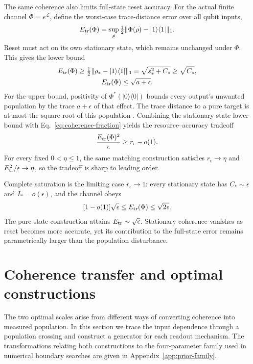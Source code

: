 \documentclass[aps,pra,reprint,amsmath,amssymb,nofootinbib,floatfix,longbibliography]{revtex4-2}
\theoremstyle{aps}
\newcommand{\eps}{\epsilon}
\newcommand{\proj}[1]{|#1\rangle\langle#1|}
\begin{document}
The same coherence also limits full-state reset accuracy. For the actual finite channel $\Phi=e^{\mathcal L}$, define the worst-case trace-distance error over all qubit inputs,
\begin{equation}\label{eq:trace-reset-error}
 E_{\rm tr}(\Phi)=\sup_\rho\tfrac12\|\Phi(\rho)-\proj1\|_1.
\end{equation}
Reset must act on its own stationary state, which remains unchanged under $\Phi$. This gives the lower bound
\begin{equation}\label{eq:trace-reset-bounds}
 \begin{gathered}
 E_{\rm tr}(\Phi)\ge\tfrac12\|\rho_*-\proj1\|_1
 =\sqrt{s_*^2+C_*}\ge\sqrt{C_*},\\
 E_{\rm tr}(\Phi)\le\sqrt{a+\eps}.
 \end{gathered}
\end{equation}
For the upper bound, positivity of $\Phi^*(\proj0)$ bounds every output's unwanted population by the trace $a+\eps$ of that effect. The trace distance to a pure target is at most the square root of this population \cite{FuchsVanDeGraaf1999}. Combining the stationary-state lower bound with Eq.~\eqref{eq:coherence-fraction} yields the resource--accuracy tradeoff
\begin{equation}\label{eq:population-state-tradeoff}
 \frac{E_{\rm tr}(\Phi)^2}{\eps}\ge r_\eps-o(1).
\end{equation}
For every fixed $0<\eta\le1$, the same matching construction satisfies $r_\eps\to\eta$ and $E_{\rm tr}^2/\eps\to\eta$, so the tradeoff is sharp to leading order.

Complete saturation is the limiting case $r_\eps\to1$: every stationary state has $C_*\sim\eps$ and $I_*=o(\eps)$, and the channel obeys
\begin{equation}\label{eq:saturation-trace-cost}
 [1-o(1)]\sqrt\eps\le E_{\rm tr}(\Phi)\le\sqrt{2\eps}.
\end{equation}
The pure-state construction attains $E_{\rm tr}\sim\sqrt\eps$. Stationary coherence vanishes as reset becomes more accurate, yet its contribution to the full-state error remains parametrically larger than the population disturbance.

\section{Coherence transfer and optimal constructions}\label{sec:mechanisms}

The two optimal scales arise from different ways of converting coherence into measured population. In this section we trace the input dependence through a population crossing and construct a generator for each readout mechanism. The transformations relating both constructions to the four-parameter family used in numerical boundary searches \cite{Shahbeigi2024} are given in Appendix~\ref{app:prior-family}.
\end{document}
